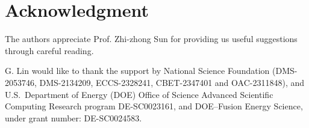 \documentclass[11pt]{article}
\begin{document}


\section*{Acknowledgment}
The authors appreciate Prof. Zhi-zhong Sun for providing us useful suggestions through careful reading.

G. Lin would like to thank the support by National Science Foundation (DMS-2053746, DMS-2134209, ECCS-2328241, CBET-2347401 and OAC-2311848), and U.S.~Department of Energy (DOE) Office of Science Advanced Scientific Computing Research program DE-SC0023161, and DOE–Fusion Energy Science, under grant number: DE-SC0024583. 


% 
\end{document}
